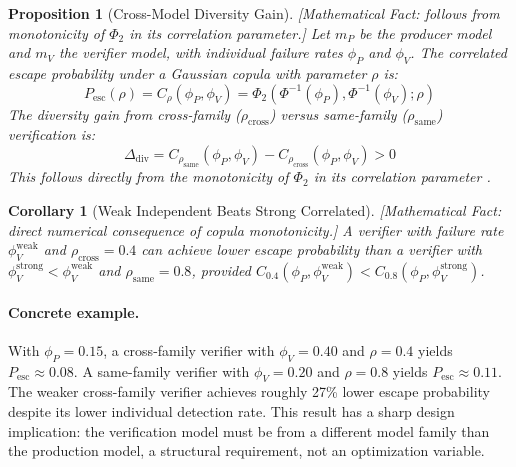 \documentclass[11pt, a4paper]{googledeepmind}
\newtheorem{proposition}{Proposition}[section]
\newtheorem{corollary}{Corollary}[section]
\begin{document}
\begin{proposition}[Cross-Model Diversity Gain]
\emph{[Mathematical Fact: follows from monotonicity of $\Phi_2$ in its correlation parameter.]}
\label{prop:routing-diversity}
Let $m_P$ be the producer model and $m_V$ the verifier model, with individual failure rates $\phi_P$ and $\phi_V$. The correlated escape probability under a Gaussian copula \citep{sklar1959} with parameter $\rho$ is:
\begin{equation}
P_{\mathrm{esc}}(\rho) = C_\rho(\phi_P, \phi_V) = \Phi_2(\Phi^{-1}(\phi_P), \Phi^{-1}(\phi_V); \rho)
\end{equation}
The diversity gain from cross-family ($\rho_{\mathrm{cross}}$) versus same-family ($\rho_{\mathrm{same}}$) verification is:
\begin{equation}
\Delta_{\mathrm{div}} = C_{\rho_{\mathrm{same}}}(\phi_P, \phi_V) - C_{\rho_{\mathrm{cross}}}(\phi_P, \phi_V) > 0
\end{equation}
This follows directly from the monotonicity of $\Phi_2$ in its correlation parameter \citep{nelsen2006copulas}.
\end{proposition}

\begin{corollary}[Weak Independent Beats Strong Correlated]
\emph{[Mathematical Fact: direct numerical consequence of copula monotonicity.]}
\label{cor:routing-weakbeats}
A verifier with failure rate $\phi_V^{\mathrm{weak}}$ and $\rho_{\mathrm{cross}} = 0.4$ can achieve lower escape probability than a verifier with $\phi_V^{\mathrm{strong}} < \phi_V^{\mathrm{weak}}$ and $\rho_{\mathrm{same}} = 0.8$, provided $C_{0.4}(\phi_P, \phi_V^{\mathrm{weak}}) < C_{0.8}(\phi_P, \phi_V^{\mathrm{strong}})$.
\end{corollary}

\paragraph{Concrete example.} With $\phi_P = 0.15$, a cross-family verifier with $\phi_V = 0.40$ and $\rho = 0.4$ yields $P_{\mathrm{esc}} \approx 0.08$. A same-family verifier with $\phi_V = 0.20$ and $\rho = 0.8$ yields $P_{\mathrm{esc}} \approx 0.11$. The weaker cross-family verifier achieves roughly 27\% lower escape probability despite its lower individual detection rate. This result has a sharp design implication: the verification model must be from a different model family than the production model, a structural requirement, not an optimization variable.
\end{document}
